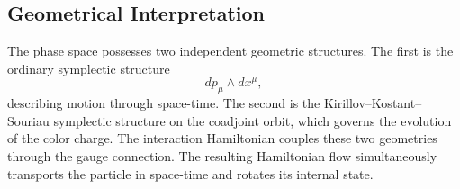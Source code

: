 \subsection{Geometrical Interpretation}
The phase space possesses two independent geometric structures.
The first is the ordinary symplectic structure
\[dp_\mu\wedge dx^\mu,\]
describing motion through space-time.
The second is the Kirillov--Kostant--Souriau symplectic structure on the
coadjoint orbit,
which governs the evolution of the color charge.
The interaction Hamiltonian couples these two geometries through the
gauge connection.
The resulting Hamiltonian flow simultaneously transports the particle in
space-time and rotates its internal state.
